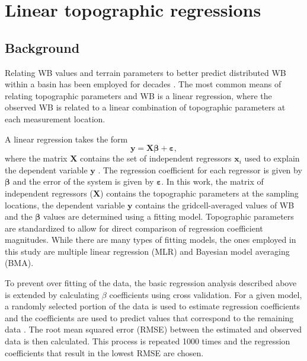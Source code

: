 \documentclass{sfuthesis}
\renewcommand{\vector}[1]{\mathbf{#1}}
\begin{document}
{%
\section{Linear topographic regressions}
\label{sec:linearregression}

\subsection{Background}
Relating WB values and terrain parameters to better predict distributed WB within a basin has been employed for decades \citep[e.g.][]{Woo1978, Molotch2005, McGrath2015}. The most common means of relating topographic parameters and WB is a linear regression, where the observed WB is related to a linear combination of topographic parameters at each measurement location. 

A linear regression takes the form
\begin{equation}
\vector{y} = \vector{X} \bm{\beta} + \bm{\varepsilon},
\end{equation}
where the matrix $\vector{X}$ contains the set of independent regressors $\vector{x}_i$ used to explain the dependent variable $\vector{y}$ \citep[e.g.][]{Davis1986}. The regression coefficient for each regressor is given by $\bm{\beta}$ and the error of the system is given by $\bm{\varepsilon}$. In this work, the matrix of independent regressors ($\vector{X}$) contains the topographic parameters at the sampling locations, the dependent variable $\vector{y}$ contains the gridcell-averaged values of WB and the $\bm{\beta}$ values are determined using a fitting model. Topographic parameters are standardized to allow for direct comparison of regression coefficient magnitudes. While there are many types of fitting models, the ones employed in this study are multiple linear regression (MLR) and Bayesian model averaging (BMA).

To prevent over fitting of the data, the basic regression analysis described above is extended by calculating $\beta$ coefficients using cross validation. For a given model, a randomly selected portion of the data is used to estimate regression coefficients and the coefficients are used to predict values that correspond to the remaining data \citep{Kohavi1995}. The root mean squared error (RMSE) between the estimated and observed data is then calculated. This process is repeated 1000 times and the regression coefficients that result in the lowest RMSE are chosen. 

}
\end{document}
